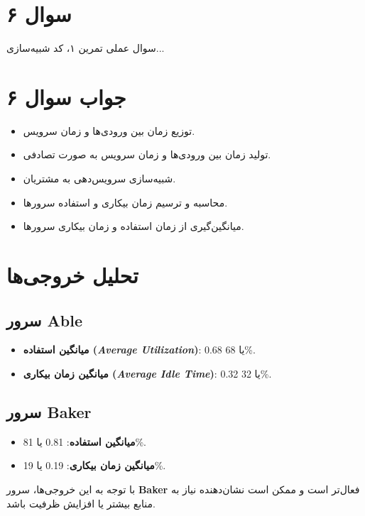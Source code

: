 \section*{سوال ۶}

سوال عملی تمرین ۱، کد شبیه‌سازی...
\section*{جواب سوال ۶}

\begin{itemize}
	\item توزیع زمان بین ورودی‌ها و زمان سرویس.
	\item تولید زمان بین ورودی‌ها و زمان سرویس به صورت تصادفی.
	\item شبیه‌سازی سرویس‌دهی به مشتریان.
	\item محاسبه و ترسیم زمان بیکاری و استفاده سرورها.
	\item میانگین‌گیری از زمان استفاده و زمان بیکاری سرورها.
\end{itemize}

\section*{تحلیل خروجی‌ها}

\subsection*{سرور Able}
\begin{itemize}
	\item \textbf{میانگین استفاده (\textit{Average Utilization})}: 0.68 یا 68\%. 
	\item \textbf{میانگین زمان بیکاری (\textit{Average Idle Time})}: 0.32 یا 32\%.
\end{itemize}

\subsection*{سرور Baker}
\begin{itemize}
	\item \textbf{میانگین استفاده}: 0.81 یا 81\%.
	\item \textbf{میانگین زمان بیکاری}: 0.19 یا 19\%.
\end{itemize}

با توجه به این خروجی‌ها، سرور \textbf{Baker} فعال‌تر است و ممکن است نشان‌دهنده نیاز به منابع بیشتر یا افزایش ظرفیت باشد.
